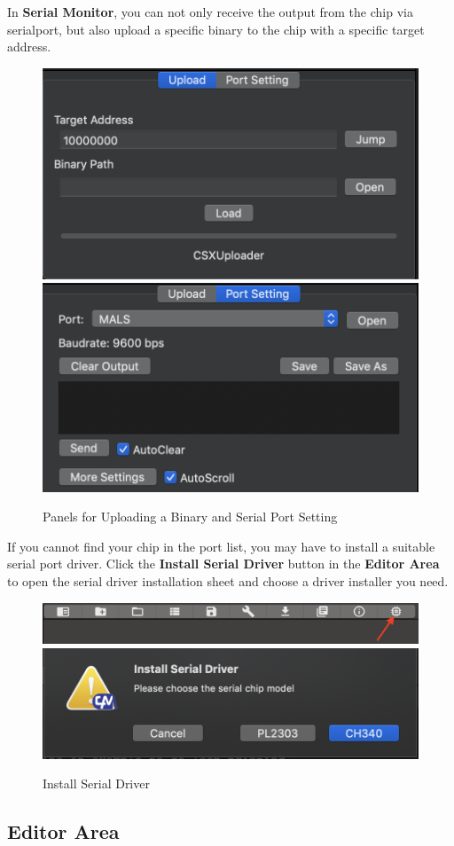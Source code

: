 \documentclass{article}
\begin{document}
			In \textbf{Serial Monitor}, you can not only receive the output from the chip via serialport, but also upload a specific binary to the chip with a specific target address.
			
			\begin{figure}[h]
				\centering
				\includegraphics[width=.49\textwidth]{SerialMonitor1} \hfill
				\includegraphics[width=.49\textwidth]{SerialMonitor2} \hfill
				\caption{Panels for Uploading a Binary and Serial Port Setting}
			\end{figure}
			
			If you cannot find your chip in the port list, you may have to install a suitable serial port driver. Click the \textbf{Install Serial Driver} button in the \textbf{Editor Area} to open the serial driver installation sheet and choose a driver installer you need.
			
			\begin{figure}[h]
				\centering
				\includegraphics[width=.6\textwidth]{ToolBar-SerialDriver}
				\includegraphics[width=.6\textwidth]{SerialDriver}
				\caption{Install Serial Driver}
			\end{figure}
		
		\newpage
		\subsection{Editor Area}
		
\end{document}
